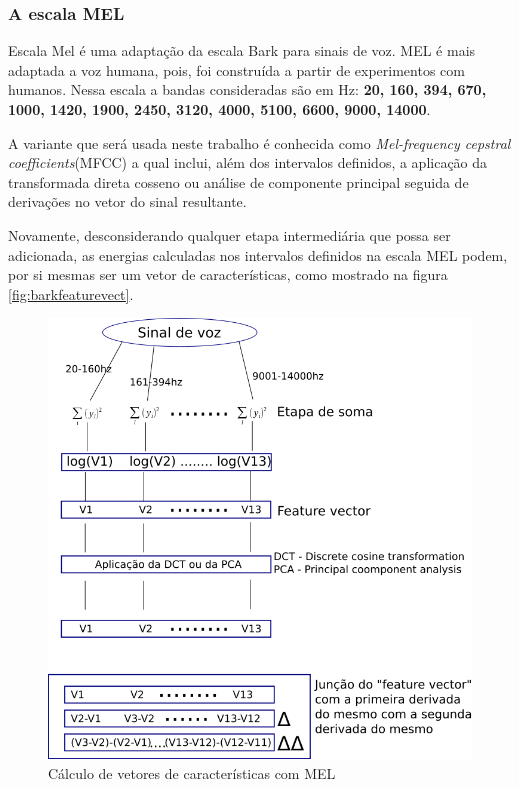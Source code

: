 	\subsubsection{A escala MEL}
		\par Escala Mel é uma adaptação da escala Bark para sinais de voz. MEL é mais adaptada a voz humana, pois, foi construída a partir de experimentos com humanos. Nessa escala a bandas consideradas são em Hz: \textbf{20, 160, 394, 670, 1000, 1420, 1900, 2450, 3120, 4000, 5100, 6600, 9000, 14000}.
		\par A variante que será usada neste trabalho é conhecida como \textit{Mel-frequency cepstral coefficients}(MFCC) a qual inclui, além dos intervalos definidos, a aplicação da transformada direta cosseno ou análise de componente principal seguida de derivações no vetor do sinal resultante.
		\par Novamente, desconsiderando qualquer etapa intermediária que possa ser adicionada, as energias calculadas nos intervalos definidos na escala MEL podem, por si mesmas ser um vetor de características, como mostrado na figura \ref{fig:barkfeaturevect}.
		\begin{figure}[h]
			\centering
			\includegraphics[width=0.8\linewidth]{images/melFeatureVect}
			\caption{Cálculo de vetores de características com MEL}
			\label{fig:melfeaturevect}
		\end{figure}
			

